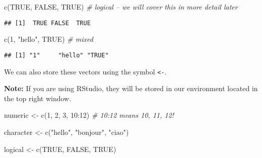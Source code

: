 \documentclass[
]{book}
\newenvironment{Shaded}{\begin{snugshade}}{\end{snugshade}}
\newcommand{\CommentTok}[1]{\textcolor[rgb]{0.56,0.35,0.01}{\textit{#1}}}
\newcommand{\ConstantTok}[1]{\textcolor[rgb]{0.00,0.00,0.00}{#1}}
\newcommand{\DecValTok}[1]{\textcolor[rgb]{0.00,0.00,0.81}{#1}}
\newcommand{\FunctionTok}[1]{\textcolor[rgb]{0.00,0.00,0.00}{#1}}
\newcommand{\NormalTok}[1]{#1}
\newcommand{\OtherTok}[1]{\textcolor[rgb]{0.56,0.35,0.01}{#1}}
\newcommand{\SpecialCharTok}[1]{\textcolor[rgb]{0.00,0.00,0.00}{#1}}
\newcommand{\StringTok}[1]{\textcolor[rgb]{0.31,0.60,0.02}{#1}}
\begin{document}
\begin{Shaded}
\begin{Highlighting}[]
\FunctionTok{c}\NormalTok{(}\ConstantTok{TRUE}\NormalTok{, }\ConstantTok{FALSE}\NormalTok{, }\ConstantTok{TRUE}\NormalTok{) }\CommentTok{\# logical – we will cover this in more detail later}
\end{Highlighting}
\end{Shaded}

\begin{verbatim}
## [1]  TRUE FALSE  TRUE
\end{verbatim}

\begin{Shaded}
\begin{Highlighting}[]
\FunctionTok{c}\NormalTok{(}\DecValTok{1}\NormalTok{, }\StringTok{"hello"}\NormalTok{, }\ConstantTok{TRUE}\NormalTok{) }\CommentTok{\# mixed}
\end{Highlighting}
\end{Shaded}

\begin{verbatim}
## [1] "1"     "hello" "TRUE"
\end{verbatim}

We can also store these vectors using the symbol \texttt{\textless{}-}.

\textbf{Note:} If you are using RStudio, they will be stored in our environment located in the top right window.

\begin{Shaded}
\begin{Highlighting}[]
\NormalTok{numeric }\OtherTok{\textless{}{-}} \FunctionTok{c}\NormalTok{(}\DecValTok{1}\NormalTok{, }\DecValTok{2}\NormalTok{, }\DecValTok{3}\NormalTok{, }\DecValTok{10}\SpecialCharTok{:}\DecValTok{12}\NormalTok{) }\CommentTok{\# 10:12 means 10, 11, 12!}
\end{Highlighting}
\end{Shaded}

\begin{Shaded}
\begin{Highlighting}[]
\NormalTok{character }\OtherTok{\textless{}{-}} \FunctionTok{c}\NormalTok{(}\StringTok{"hello"}\NormalTok{, }\StringTok{"bonjour"}\NormalTok{, }\StringTok{"ciao"}\NormalTok{)}
\end{Highlighting}
\end{Shaded}

\begin{Shaded}
\begin{Highlighting}[]
\NormalTok{logical }\OtherTok{\textless{}{-}} \FunctionTok{c}\NormalTok{(}\ConstantTok{TRUE}\NormalTok{, }\ConstantTok{FALSE}\NormalTok{, }\ConstantTok{TRUE}\NormalTok{)}
\end{Highlighting}
\end{Shaded}
\end{document}
